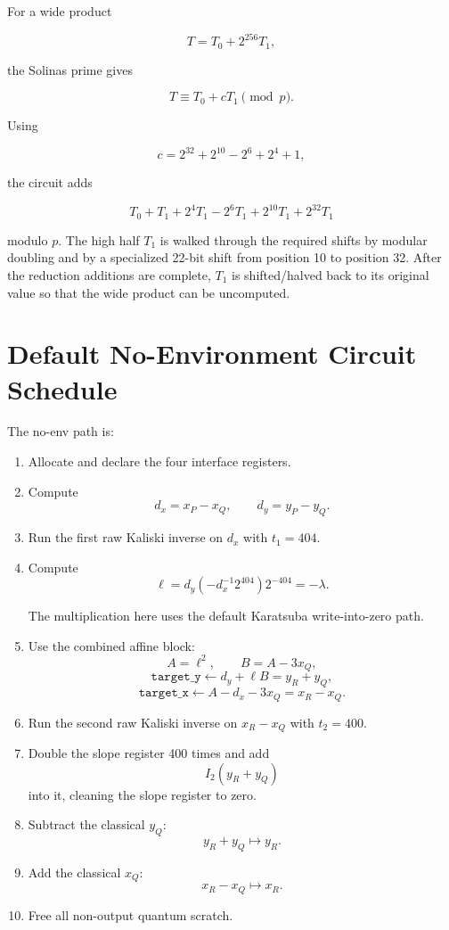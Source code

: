 \documentclass[11pt]{article}
\newcommand{\dx}{d_x}
\newcommand{\dy}{d_y}
\newcommand{\ellv}{\ell}
\begin{document}
For a wide product

\[
T=T_0+2^{256}T_1,
\]

the Solinas prime gives

\[
T \equiv T_0 + cT_1 \pmod p.
\]

Using

\[
c=2^{32}+2^{10}-2^6+2^4+1,
\]

the circuit adds

\[
T_0
+T_1
+2^4T_1
-2^6T_1
+2^{10}T_1
+2^{32}T_1
\]

modulo \(p\).  The high half \(T_1\) is walked through the required shifts by
modular doubling and by a specialized 22-bit shift from position 10 to position
32.  After the reduction additions are complete, \(T_1\) is shifted/halved back
to its original value so that the wide product can be uncomputed.

\section{Default No-Environment Circuit Schedule}

The no-env path is:

\begin{enumerate}
  \item Allocate and declare the four interface registers.

  \item Compute
  \[
  \dx=x_P-x_Q,
  \qquad
  \dy=y_P-y_Q.
  \]

  \item Run the first raw Kaliski inverse on \(\dx\) with \(t_1=404\).

  \item Compute
  \[
  \ellv = \dy(-\dx^{-1}2^{404})2^{-404}
        = -\lambda.
  \]

  The multiplication here uses the default Karatsuba write-into-zero path.

  \item Use the combined affine block:
  \[
  A=\ellv^2,
  \qquad
  B=A-3x_Q,
  \]
  \[
  \texttt{target\_y}\leftarrow \dy+\ellv B = y_R+y_Q,
  \]
  \[
  \texttt{target\_x}\leftarrow A-\dx-3x_Q = x_R-x_Q.
  \]

  \item Run the second raw Kaliski inverse on \(x_R-x_Q\) with \(t_2=400\).

  \item Double the slope register 400 times and add
  \[
  I_2(y_R+y_Q)
  \]
  into it, cleaning the slope register to zero.

  \item Subtract the classical \(y_Q\):
  \[
  y_R+y_Q\mapsto y_R.
  \]

  \item Add the classical \(x_Q\):
  \[
  x_R-x_Q\mapsto x_R.
  \]

  \item Free all non-output quantum scratch.
\end{enumerate}
\end{document}
